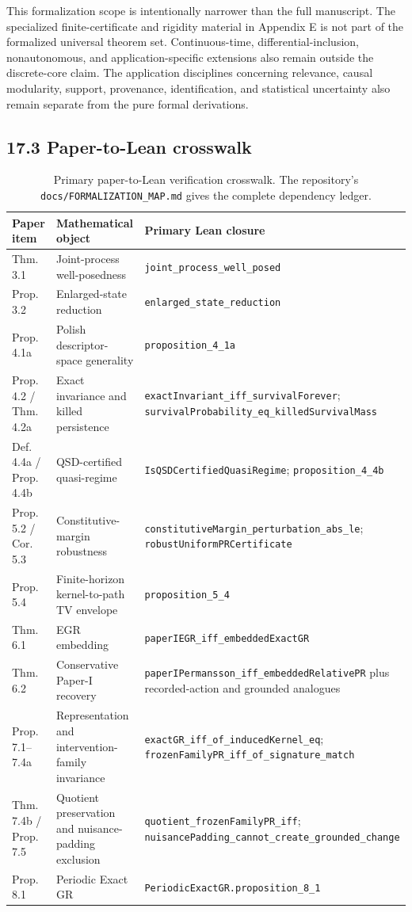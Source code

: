 \documentclass[10pt]{article}
\begin{document}
This formalization scope is intentionally narrower than the full manuscript. The specialized finite-certificate and rigidity material in Appendix E is not part of the formalized universal theorem set. Continuous-time, differential-inclusion, nonautonomous, and application-specific extensions also remain outside the discrete-core claim. The application disciplines concerning relevance, causal modularity, support, provenance, identification, and statistical uncertainty also remain separate from the pure formal derivations.

\subsection{17.3 Paper-to-Lean crosswalk}\label{paper-lean-crosswalk}

\begin{table}[htbp]
\centering
\scriptsize
\caption{Primary paper-to-Lean verification crosswalk. The repository's \texttt{docs/FORMALIZATION\_MAP.md} gives the complete dependency ledger.}
\label{tab:paper-lean-crosswalk}
\begin{tabularx}{\textwidth}{@{}p{}p{}X@{}}
\toprule
Paper item & Mathematical object & Primary Lean closure \\
\midrule
Thm. 3.1 & Joint-process well-posedness & \nolinkurl{joint_process_well_posed} \\
Prop. 3.2 & Enlarged-state reduction & \nolinkurl{enlarged_state_reduction} \\
Prop. 4.1a & Polish descriptor-space generality & \nolinkurl{proposition_4_1a} \\
Prop. 4.2 / Thm. 4.2a & Exact invariance and killed persistence & \nolinkurl{exactInvariant_iff_survivalForever}; \nolinkurl{survivalProbability_eq_killedSurvivalMass} \\
Def. 4.4a / Prop. 4.4b & QSD-certified quasi-regime & \nolinkurl{IsQSDCertifiedQuasiRegime}; \nolinkurl{proposition_4_4b} \\
Prop. 5.2 / Cor. 5.3 & Constitutive-margin robustness & \nolinkurl{constitutiveMargin_perturbation_abs_le}; \nolinkurl{robustUniformPRCertificate} \\
Prop. 5.4 & Finite-horizon kernel-to-path TV envelope & \nolinkurl{proposition_5_4} \\
Thm. 6.1 & EGR embedding & \nolinkurl{paperIEGR_iff_embeddedExactGR} \\
Thm. 6.2 & Conservative Paper-I recovery & \nolinkurl{paperIPermansson_iff_embeddedRelativePR} plus recorded-action and grounded analogues \\
Prop. 7.1--7.4a & Representation and intervention-family invariance & \nolinkurl{exactGR_iff_of_inducedKernel_eq}; \nolinkurl{frozenFamilyPR_iff_of_signature_match} \\
Thm. 7.4b / Prop. 7.5 & Quotient preservation and nuisance-padding exclusion & \nolinkurl{quotient_frozenFamilyPR_iff}; \nolinkurl{nuisancePadding_cannot_create_grounded_change} \\
Prop. 8.1 & Periodic Exact GR & \nolinkurl{PeriodicExactGR.proposition_8_1} \\
\bottomrule
\end{tabularx}
\end{table}
\end{document}
